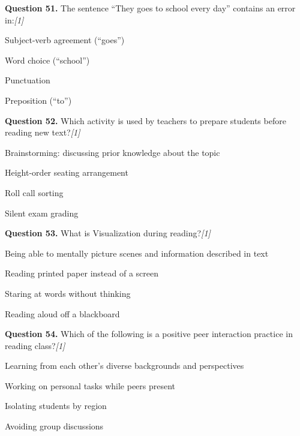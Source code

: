 \documentclass[11pt,a4paper]{article}
\newcommand{\pts}[1]{\hfill   \textit{[#1]}}
\begin{document}
\noindent   \textbf{Question 51.} The sentence ``They goes to school every day'' contains an error in:\pts{1}

\begin{parts}
  \item Subject-verb agreement (``goes'')
  \item Word choice (``school'')
  \item Punctuation
  \item Preposition (``to'')
\end{parts}

\medskip




\noindent   \textbf{Question 52.} Which activity is used by teachers to prepare students before reading new text?\pts{1}

\begin{parts}
  \item Brainstorming: discussing prior knowledge about the topic
  \item Height-order seating arrangement
  \item Roll call sorting
  \item Silent exam grading
\end{parts}

\medskip




\noindent   \textbf{Question 53.} What is Visualization during reading?\pts{1}

\begin{parts}
  \item Being able to mentally picture scenes and information described in text
  \item Reading printed paper instead of a screen
  \item Staring at words without thinking
  \item Reading aloud off a blackboard
\end{parts}

\medskip




\noindent   \textbf{Question 54.} Which of the following is a positive peer interaction practice in reading class?\pts{1}

\begin{parts}
  \item Learning from each other's diverse backgrounds and perspectives
  \item Working on personal tasks while peers present
  \item Isolating students by region
  \item Avoiding group discussions
\end{parts}
\end{document}
